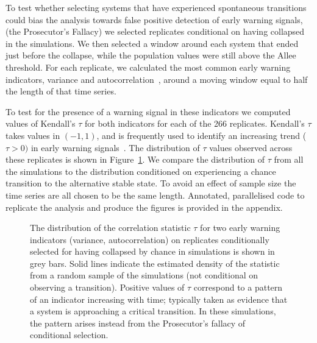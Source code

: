 \documentclass[authoryear,review,12pt]{elsarticle}
\newif\ifhavefigures
\begin{document}
To test whether selecting systems that have experienced
spontaneous transitions could bias the analysis towards false
positive detection of early warning signals, (the Prosecutor's
Fallacy) we selected replicates conditional on having collapsed
in the simulations.  We then selected a window around each system
that ended just before the collapse, while the population values
were still above the Allee threshold.  For each replicate, we
calculated the most common early warning indicators, variance and
autocorrelation~\citep[\emph{e.g.}][]{Carpenter2006,Dakos2008,Scheffer2009},
around a moving window equal to half the length of that time series.


To test for the presence of a warning signal in these indicators we
computed values of Kendall's $\tau$ for both indicators for each of
the 266 replicates.  Kendall's $\tau$ takes values in $(-1, 1)$, and is
frequently used to identify an increasing trend ($\tau > 0 )$ in early
warning signals~\citep{Dakos2008, Dakos2011}.  The distribution
of $\tau$ values observed across these replicates is shown in
Figure~\ref{fig:indicator}.   
We compare the distribution of $\tau$ from all the simulations to
the distribution conditioned on experiencing a chance transition to the
alternative stable state.  To avoid an effect of sample size the time series are all chosen
to be the same length.  
Annotated, parallelised code to replicate the analysis
and produce the figures is provided in the appendix. 

\begin{figure}
  \begin{center}
    \ifhavefigures
    \fi
  \end{center}
  \caption{The distribution of the correlation statistic $\tau$ for two
  early warning indicators (variance, autocorrelation) on replicates
  conditionally selected for having collapsed by chance in simulations
  is shown in grey bars.  Solid lines indicate the estimated density of
  the statistic from a random sample of the simulations (not conditional
  on observing a transition). Positive values of $\tau$ correspond to
  a pattern of an indicator increasing with time; typically taken as
  evidence that a system is approaching a critical transition.  In these
  simulations, the pattern arises instead from the Prosecutor's fallacy
  of conditional selection.}
  \label{fig:indicator}
\end{figure}
\end{document}

